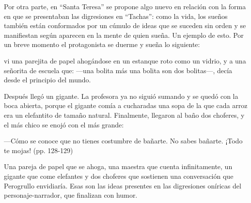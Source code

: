 \documentclass[14pt,twoside,final]{extbook} %
\begin{document}
Por otra parte, en ``Santa Teresa'' se propone algo nuevo en relación con la forma en que se presentaban las digresiones en ``Tachas'': como la vida, los sueños también están conformados por un cúmulo de ideas que se suceden sin orden y se manifiestan según aparecen en la mente de quien sueña. Un ejemplo de esto. Por un breve momento el protagonista se duerme y sueña lo siguiente:
\begin{quoting}
vi una parejita de papel ahogándose en un estanque roto como un vidrio, y a una señorita de escuela que: ---una bolita más una bolita son dos bolitas---, decía desde el principio del mundo.

Después llegó un gigante. La profesora ya no siguió sumando y se quedó con la boca abierta, porque el gigante comía a cucharadas una sopa de la que cada arroz era un elefantito de tamaño natural. Finalmente, llegaron al baño dos choferes, y el más chico se enojó con el más grande:

---Cómo se conoce que no tienes costumbre de bañarte. No sabes bañarte. ¡Todo te mojas! (pp. 128-129)
\end{quoting}
Una pareja de papel que se ahoga, una maestra que cuenta infinitamente, un gigante que come elefantes y dos choferes que sostienen una conversación que Perogrullo envidiaría. Esas son las ideas presentes en las digresiones oníricas del personaje-narrador, que finalizan con humor.
\end{document}
